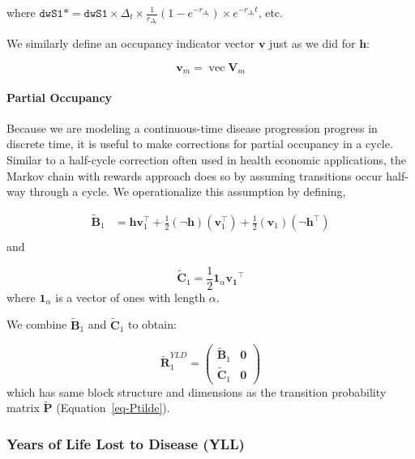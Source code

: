 \documentclass[
]{agujournal2019}
\let\oldparagraph\paragraph
\renewcommand{\paragraph}[1]{\oldparagraph{#1}\mbox{}}
\begin{document}
where
\(\texttt{dwS1}* = \texttt{dwS1} \times \Delta_t  \times  \frac{1}{r_{\Delta_t}}(1-e^{-r_{\Delta_t}}) \times e^{-r_{\Delta_t} t}\),
etc.

We similarly define an occupancy indicator vector \(\mathbf{v}\) just as
we did for \(\mathbf{h}\):

\[
\mathbf{v}_{m}=\operatorname{vec} \mathbf{V}_{m}
\]

\paragraph{Partial Occupancy}\label{partial-occupancy}

Because we are modeling a continuous-time disease progression progress
in discrete time, it is useful to make corrections for partial occupancy
in a cycle. Similar to a half-cycle correction often used in health
economic applications, the Markov chain with rewards approach does so by
assuming transitions occur half-way through a cycle. We operationalize
this assumption by defining,

\[
\begin{aligned}
\widetilde{\mathbf{B}}_{1} & =\mathbf{h} \mathbf{v}_{1}^{\top}+\frac{1}{2}(\neg \mathbf{h})\left(\mathbf{v}_{1}^{\top}\right)+\frac{1}{2}\left(\mathbf{v}_{1}\right)\left(\neg \mathbf{h}^{\top}\right) \\
\end{aligned}
\] and

\[
\widetilde{\mathbf{C}}_{1}=\frac{1}{2} \mathbf{1}_{\alpha} \mathbf{v_1}^{\top}
\] where \(\mathbf{1}_{\alpha}\) is a vector of ones with length
\(\alpha\).

We combine \(\widetilde{\mathbf{B}}_{1}\) and
\(\widetilde{\mathbf{C}}_{1}\) to obtain:

\[
\widetilde{\mathbf{R}}^{YLD}_{1}=\left(\begin{array}{c|c}
\widetilde{\mathbf{B}}_{1} & \mathbf{0} \\
\hline \widetilde{\mathbf{C}}_{1} & \mathbf{0}
\end{array}\right) 
\] which has same block structure and dimensions as the transition
probability matrix \(\widetilde{\mathbf{P}}\)
(Equation~\ref{eq-Ptilde}).

\subsubsection{Years of Life Lost to Disease
(YLL)}\label{years-of-life-lost-to-disease-yll}
\end{document}
